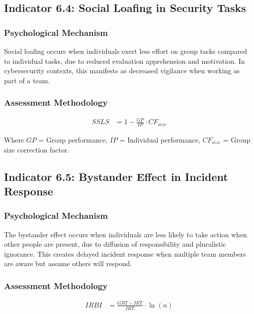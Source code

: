 \documentclass[11pt,a4paper]{article}
\begin{document}
\subsection{Indicator 6.4: Social Loafing in Security Tasks}

\subsubsection{Psychological Mechanism}

Social loafing occurs when individuals exert less effort on group tasks compared to individual tasks, due to reduced evaluation apprehension and motivation. In cybersecurity contexts, this manifests as decreased vigilance when working as part of a team.

\subsubsection{Assessment Methodology}

\begin{align}
SSLS &= 1 - \frac{GP}{IP} \cdot CF_{size}
\end{align}

Where $GP$ = Group performance, $IP$ = Individual performance, $CF_{size}$ = Group size correction factor.

\subsection{Indicator 6.5: Bystander Effect in Incident Response}

\subsubsection{Psychological Mechanism}

The bystander effect occurs when individuals are less likely to take action when other people are present, due to diffusion of responsibility and pluralistic ignorance. This creates delayed incident response when multiple team members are aware but assume others will respond.

\subsubsection{Assessment Methodology}

\begin{align}
IRBI &= \frac{GRT - IRT}{IRT} \cdot \ln(n)
\end{align}
\end{document}
